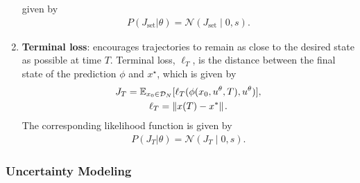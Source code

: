 \begin{enumerate}
    given by 
    \begin{align}
        P(J_{\textrm{set}} | \theta) = \mathcal{N}(J_{\textrm{set}} \; | \; 0, s).
        \label{eq:set_likelihood}
    \end{align}
    \item \textbf{Terminal loss}: encourages trajectories to remain as close to the
    desired state as possible at time $T$. Terminal loss, $\ell_T$, is the
    distance between the final state of the prediction $\phi$ and $x^\star$,
    which is given by
    \begin{equation}
        \begin{gathered}
            J_T = \mathbb{E}_{x_0 \in \mathcal{D}_N}[ \ell_T( \phi(x_0, u^\theta, T), u^\theta) ], \\
            \ell_T = \|{x(T) - x^*}\|_{{}_{}}.
        \end{gathered}
        \label{eq:nn_controller_j} 
    \end{equation}
    The corresponding likelihood function is given by 
    \begin{align}
        P(J_T | \theta) = \mathcal{N}(J_T \; | \; 0, s).
        \label{eq:terminal_likelihood}
    \end{align}
\end{enumerate}

\subsubsection{Uncertainty Modeling}

